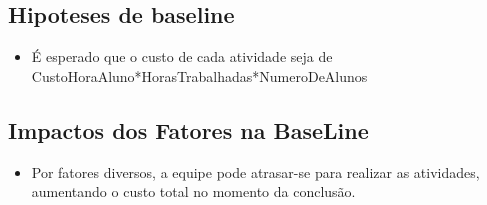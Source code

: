 	\subsection{Hipoteses de baseline}
		\begin{itemize}  
		\item É esperado que o custo de cada atividade seja de CustoHoraAluno*HorasTrabalhadas*NumeroDeAlunos
		\end{itemize}
	\subsection{Impactos dos Fatores na BaseLine}
		\begin{itemize}  
		\item Por fatores diversos, a equipe pode atrasar-se para realizar as atividades, aumentando o custo total no momento da conclusão.
		\end{itemize}